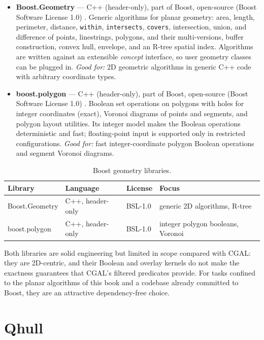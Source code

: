 \begin{itemize}
  \item \textbf{Boost.Geometry} --- C++ (header-only), part of Boost,
    open-source (Boost Software License 1.0) \cite{boostgeometry}.
    Generic algorithms for planar geometry: area, length, perimeter,
    distance, \texttt{within}, \texttt{intersects}, \texttt{covers},
    intersection, union, and difference of points, linestrings,
    polygons, and their multi-versions, buffer construction, convex
    hull, envelope, and an R-tree spatial index. Algorithms are written
    against an extensible \emph{concept} interface, so user geometry
    classes can be plugged in. \emph{Good for:} 2D geometric algorithms
    in generic C++ code with arbitrary coordinate types.
  \item \textbf{boost.polygon} --- C++ (header-only), part of Boost,
    open-source (Boost Software License 1.0) \cite{boostpolygon}.
    Boolean set operations on polygons with holes for integer
    coordinates (exact), Voronoi diagrams of points and segments, and
    polygon layout utilities. Its integer model makes the Boolean
    operations deterministic and fast; floating-point input is supported
    only in restricted configurations. \emph{Good for:} fast
    integer-coordinate polygon Boolean operations and segment Voronoi
    diagrams.
\end{itemize}

\begin{table}[ht]
\centering
\begin{tabular}{llll}
\hline
\textbf{Library} & \textbf{Language} & \textbf{License} & \textbf{Focus} \\
\hline
Boost.Geometry & C++, header-only & BSL-1.0 & generic 2D algorithms, R-tree \\
boost.polygon  & C++, header-only & BSL-1.0 & integer polygon booleans, Voronoi \\
\hline
\end{tabular}
\caption{Boost geometry libraries.}
\label{tbl:appsoft_boost}
\end{table}

Both libraries are solid engineering but limited in scope compared with
CGAL: they are 2D-centric, and their Boolean and overlay kernels do not
make the exactness guarantees that CGAL's filtered predicates provide.
For tasks confined to the planar algorithms of this book and a codebase
already committed to Boost, they are an attractive dependency-free choice.

\section{Qhull}
\label{sec:app_soft_qhull}


